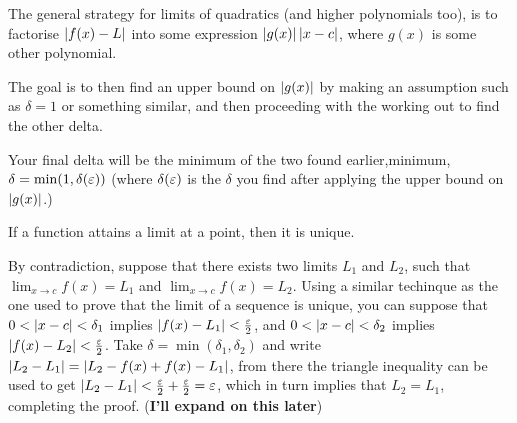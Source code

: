 \documentclass[12pt]{article}
\theoremstyle{definition}
\renewenvironment{proof}[1][\proofname]{\vspace{-10pt}\begin{replacementproof}}{\end{replacementproof}}
\begin{document}
            \begin{remark}
                The general strategy for limits of quadratics (and higher polynomials too), is to factorise $\left|f(x) - L\right|$ into some expression $\left|g(x)\right|\left|x - c\right|$, where $g(x)$ is some other polynomial. 
                
                The goal is to then find an upper bound on $\left|g(x)\right|$ by making an assumption such as $\delta = 1$ or something similar, and then proceeding with the working out to find the other delta. 
                
                Your final delta will be the minimum of the two found earlier,minimum, $\delta = \min(1, \delta(\varepsilon))$ (where $\delta(\varepsilon)$ is the $\delta$ you find after applying the upper bound on $\left|g(x)\right|$.)
            \end{remark}

            \begin{prop}
                If a function attains a limit at a point, then it is unique.
            \end{prop}
            \begin{proof}
                By contradiction, suppose that there exists two limits $L_{1}$ and $L_{2}$, such that $\lim_{x \rightarrow c}f(x) = L_{1}$ and $\lim_{x \rightarrow c}f(x) = L_{2}$. Using a similar techinque as the one used to prove that the limit of a sequence is unique, you can suppose that $0 < \left|x - c\right| < \delta_{1}$ implies $\left|f(x) - L_{1}\right| < \frac{\varepsilon}{2}$, and $0 < \left|x - c\right| < \delta_{2}$ implies $\left|f(x) - L_{2}\right| < \frac{\varepsilon}{2}$. Take $\delta = \min(\delta_{1}, \delta_{2})$ and write $\left|L_{2} - L_{1}\right| = \left|L_{2} - f(x) + f(x) - L_{1}\right|$, from there the triangle inequality can be used to get $\left|L_{2} - L_{1}\right| < \frac{\varepsilon}{2} + \frac{\varepsilon}{2} = \varepsilon$, which in turn implies that $L_{2} = L_{1}$, completing the proof. (\textbf{I'll expand on this later})
            \end{proof}
\end{document}

